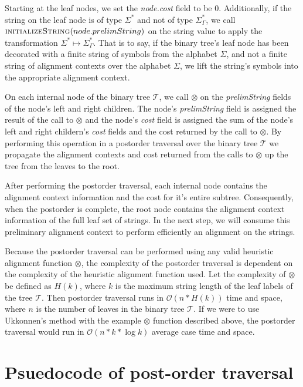 \documentclass[11pt]{article}
\begin{document}
Starting at the leaf nodes, we set the \textit{node.cost} field to be $0$.
Additionally, if the string on the leaf node is of type $\Sigma^{*}$ and not of type $\Sigma^{*}_{\Gamma}$, we call $\Call{initializeString}{node.prelimString}$ on the string value to apply the transformation $\Sigma^{*} \mapsto \Sigma^{*}_{\Gamma}$.
That is to say, if the binary tree's leaf node has been decorated with a finite string of symbols from the alphabet $\Sigma$, and not a finite string of alignment contexts over the alphabet $\Sigma$, we lift the string's symbols into the appropriate alignment context. %

On each internal node of the binary tree $\mathcal{T}$, we call $\otimes$ on the \textit{prelimString} fields of the node's left and right children.
The node's \textit{prelimString} field is assigned the result of the call to $\otimes$ and the node's  \textit{cost} field is assigned the sum of the node's left and right childern's \textit{cost} fields and the cost returned by the call to $\otimes$.
By performing this operation in a postorder traversal over the binary tree $\mathcal{T}$ we propagate the alignment contexts and cost returned from the calls to $\otimes$ up the tree from the leaves to the root.

After performing the postorder traversal, each internal node contains the alignment context information and the cost for it's entire subtree.
Consequently, when the postorder is complete, the root node contains the alignment context information of the full leaf set of strings.
In the next step, we will consume this preliminary alignment context to perform efficiently an alignment on the strings.

Because the postorder traversal can be performed using any valid heuristic alignment function $\otimes$, the complexity of the postorder traversal is dependent on the complexity of the heuristic alignment function used. Let the complexity of $\otimes$ be defined as $H\left(k\right)$, where $k$ is the maximum string length of the leaf labels of the tree $\mathcal{T}$. Then postorder traversal runs in $\mathcal{O}(n * H(k))$ time and space, where $n$ is the number of leaves in the binary tree $\mathcal{T}$. If we were to use Ukkonnen's method with the example $\otimes$ function described above, the postorder traversal would run in $\mathcal{O}\left( n * k * \log  k \right)$ average case time and space.

\section{Psuedocode of post-order traversal}
\end{document}
